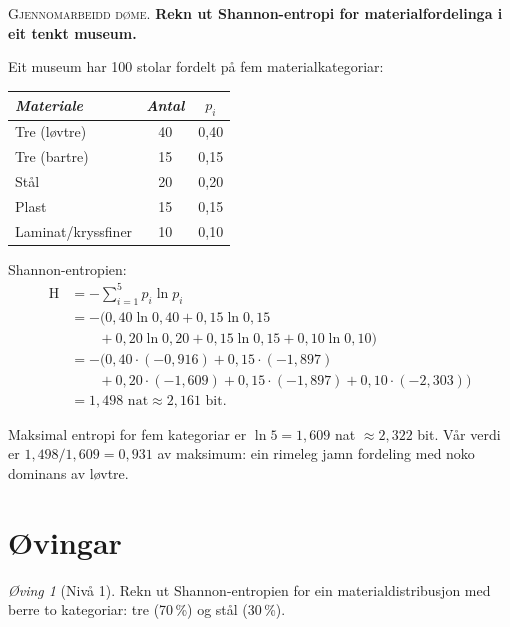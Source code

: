 \documentclass[10pt]{book}
\renewcommand{\footnotesize}{\fontsize{8pt}{10pt}\selectfont}
\theoremstyle{definition}
\theoremstyle{plain}
\theoremstyle{remark}
\newtheorem{exercise}[definisjon]{\O{}ving}
\newenvironment{gjennomgang}%
  {\medskip\noindent\textsc{Gjennomarbeidd d\o me.}\enspace}%
  {\medskip}
\DeclareMathOperator{\Ent}{H}
\begin{document}
\begin{gjennomgang}
\textbf{Rekn ut Shannon-entropi for materialfordelinga i eit tenkt museum.}

Eit museum har 100 stolar fordelt p\aa{} fem materialkategoriar:
\begin{center}
{\footnotesize
\begin{tabular}{lcc}
\textit{Materiale} & \textit{Antal} & $p_i$ \\
\hline
Tre (l\o vtre)  & 40 & 0{,}40 \\
Tre (bartre)    & 15 & 0{,}15 \\
St\aa l          & 20 & 0{,}20 \\
Plast           & 15 & 0{,}15 \\
Laminat/kryss\-finer & 10 & 0{,}10 \\
\end{tabular}
}
\end{center}

Shannon-entropien:
\begin{align*}
  \Ent &= -\sum_{i=1}^{5} p_i \ln p_i \\
     &= -\bigl(0{,}40 \ln 0{,}40
        + 0{,}15 \ln 0{,}15 \\
     &\qquad + 0{,}20 \ln 0{,}20
        + 0{,}15 \ln 0{,}15
        + 0{,}10 \ln 0{,}10\bigr) \\
     &= -\bigl(0{,}40 \cdot ({-}0{,}916)
        + 0{,}15 \cdot ({-}1{,}897) \\
     &\qquad + 0{,}20 \cdot ({-}1{,}609)
        + 0{,}15 \cdot ({-}1{,}897)
        + 0{,}10 \cdot ({-}2{,}303)\bigr) \\
     &= 1{,}498 \text{ nat} \approx 2{,}161 \text{ bit}.
\end{align*}

Maksimal entropi for fem kategoriar er $\ln 5 = 1{,}609$ nat $\approx 2{,}322$ bit.
V\aa r verdi er $1{,}498 / 1{,}609 = 0{,}931$ av maksimum: ein rimeleg jamn fordeling med noko dominans av l\o vtre.
\end{gjennomgang}

\section{\O vingar}

\begin{exercise}[Niv\aa{} 1]\label{ex:4.1}
Rekn ut Shannon-entropien for ein materialdistribusjon med berre to kategoriar: tre (70\,\%) og st\aa l (30\,\%).
\end{exercise}
\end{document}
